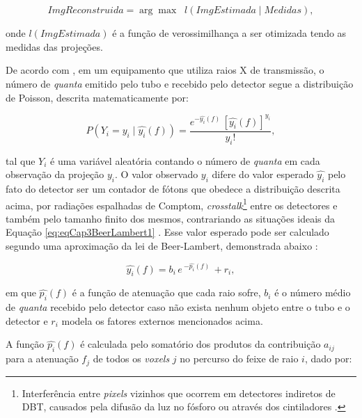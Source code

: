 {{\begin{equation}
ImgReconstruida = \underset{}{\arg\max} \;\; l(ImgEstimada \mid Medidas),
\label{eq:eqCap3ModeloVerossimilhança}
\end{equation} 

\noindent onde $l(ImgEstimada)$ é a função de verossimilhança a ser otimizada tendo as medidas das projeções.


De acordo com , em um equipamento que utiliza raios X de transmissão, o número de \textit{quanta} emitido pelo tubo e recebido pelo detector segue a distribuição de Poisson, descrita matematicamente por:

\begin{equation}
P(Y_{i} = y_{i} \mid \hat{y_{i}}(f) ) = \dfrac{e^{-\hat{y_{i}}(f) } \, [\hat{y_{i}}(f)] ^{y_{i}}}  {y_{i}!},
\label{eq:eqCap3DistribuicaoPoisson}
\end{equation}

\noindent tal que $Y_{i}$ é uma variável aleatória contando o número de \textit{quanta} em cada observação da projeção $y_{i}$. O valor observado $y_{i}$ difere do valor esperado $\hat{y_{i}}$ pelo fato do detector ser um contador de fótons que obedece a distribuição descrita acima, por radiações espalhadas de Comptom, \textit{crosstalk}\footnote{Interferência entre \textit{pixels} vizinhos que ocorrem em detectores indiretos de \acs{DBT}, causados pela difusão da luz no fósforo ou através dos cintiladores \cite{zheng2018detector}.} entre os detectores e também pelo tamanho finito dos mesmos, contrariando as situações ideais da Equação \ref{eq:eqCap3BeerLambert1} \cite[p. 6]{Fessler2000handbook}. Esse valor esperado pode ser calculado segundo uma aproximação da lei de Beer-Lambert, demonstrada abaixo \cite[p. 9]{Fessler2000handbook}:

\begin{equation}
\hat{y_{i}}(f) = b_{i} \, e \, ^{-\hat{p_{i}}(f)} \, + r_{i},
\label{eq:eqCap3BeerLambertDiscreto2}
\end{equation}

\noindent em que $\hat{p_{i}}(f)$ é a função de atenuação que cada raio sofre, $b_{i}$ é o número médio de \textit{quanta} recebido pelo detector caso não exista nenhum objeto entre o tubo e o detector e $r_{i}$ modela os fatores externos mencionados acima. 

A função $\hat{p_{i}}(f)$ é calculada pelo somatório dos produtos da contribuição $a_{ij}$ para a atenuação $f_{j}$ de todos os \textit{voxels} $j$ no percurso do feixe de raio $i$, dado por: 


}}
